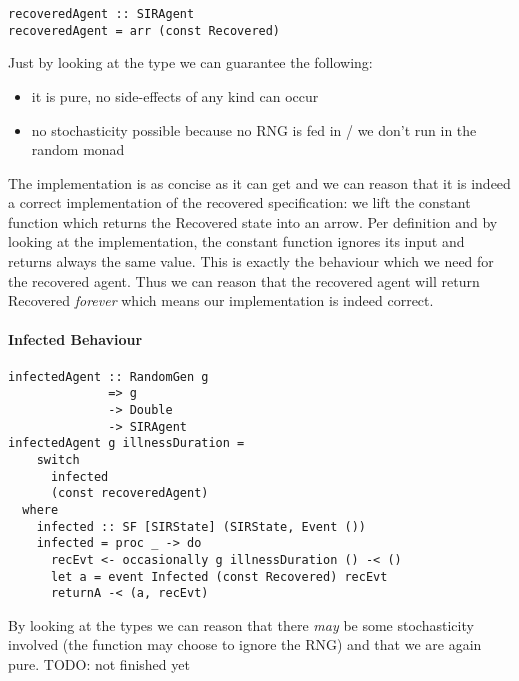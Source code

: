 \begin{verbatim}
recoveredAgent :: SIRAgent
recoveredAgent = arr (const Recovered)
\end{verbatim}

Just by looking at the type we can guarantee the following:
\begin{itemize}
	\item it is pure, no side-effects of any kind can occur
	\item no stochasticity possible because no RNG is fed in / we don't run in the random monad
\end{itemize}

The implementation is as concise as it can get and we can reason that it is indeed a correct implementation of the recovered specification: we lift the constant function which returns the Recovered state into an arrow. Per definition and by looking at the implementation, the constant function ignores its input and returns always the same value. This is exactly the behaviour which we need for the recovered agent. Thus we can reason that the recovered agent will return Recovered \textit{forever} which means our implementation is indeed correct.

\paragraph{Infected Behaviour}
\begin{verbatim}
infectedAgent :: RandomGen g 
              => g 
              -> Double
              -> SIRAgent
infectedAgent g illnessDuration = 
    switch 
      infected 
      (const recoveredAgent)
  where
    infected :: SF [SIRState] (SIRState, Event ())
    infected = proc _ -> do
      recEvt <- occasionally g illnessDuration () -< ()
      let a = event Infected (const Recovered) recEvt
      returnA -< (a, recEvt)
\end{verbatim}

By looking at the types we can reason that there \textit{may} be some stochasticity involved (the function may choose to ignore the RNG) and that we are again pure. TODO: not finished yet

